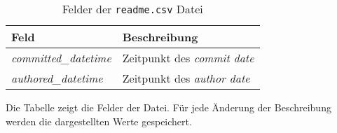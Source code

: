 \begin{table}
    \centering
    \setlength{\tabcolsep}{8pt}
    \begin{tabular}{p{4cm}|p{9.5cm}}
        \toprule
        \textbf{Feld} & \textbf{Beschreibung} \\ \midrule
        \emph{committed\_datetime} & Zeitpunkt des \emph{commit date} \\
        \emph{authored\_datetime} & Zeitpunkt des \emph{author date} \\
        \bottomrule
    \end{tabular}
    \caption{Felder der \texttt{readme.csv} Datei}
    \label{tab:readme}
    \small
    Die Tabelle zeigt die Felder der  Datei. Für jede Änderung der Beschreibung werden die dargestellten Werte gespeichert.
\end{table}
